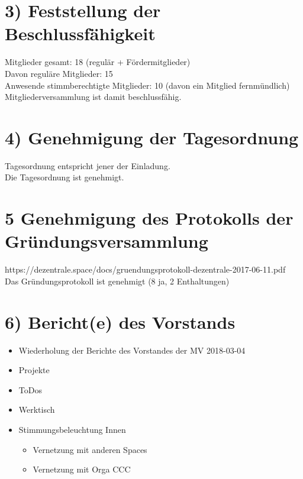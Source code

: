 \documentclass[10pt,a4paper]{scrartcl}
\begin{document}
\section*{3) Feststellung der Beschlussf{\"a}higkeit}
Mitglieder gesamt: 18 (regul{\"a}r + F{\"o}rdermitglieder)\\
Davon regul{\"a}re Mitglieder: 15\\
Anwesende stimmberechtigte Mitglieder: 10 (davon ein Mitglied fernm{\"u}ndlich)\\
Mitgliederversammlung ist damit beschlussf{\"a}hig.

\section*{4) Genehmigung der Tagesordnung}
Tagesordnung entspricht jener der Einladung.\\
Die Tagesordnung ist genehmigt.

\section*{5 Genehmigung des Protokolls der Gr{\"u}ndungsversammlung}
    https://dezentrale.space/docs/gruendungsprotokoll-dezentrale-2017-06-11.pdf\\
Das Gr{\"u}ndungsprotokoll ist genehmigt (8 ja, 2 Enthaltungen)

\section*{6) Bericht(e) des Vorstands}
	\begin{itemize}
		\item Wiederholung der Berichte des Vorstandes der MV 2018-03-04
		\item Projekte
		\item ToDos
		\item Werktisch
		\item Stimmungsbeleuchtung Innen
		\begin{itemize}
			\item Vernetzung mit anderen Spaces
			\item Vernetzung mit Orga CCC
		\end{itemize}
	\end{itemize}
\end{document}

